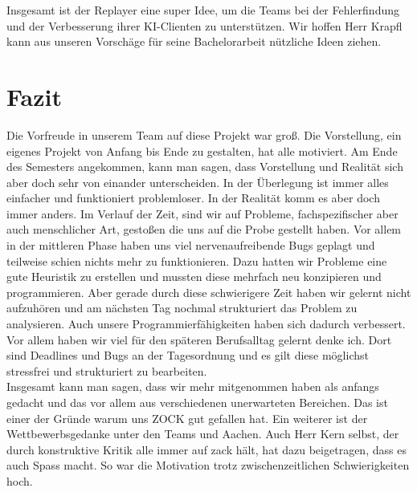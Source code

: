 \documentclass[12pt,a4paper,bibliography=totocnumbered,listof=totocnumbered]{scrartcl}
\begin{document}
	Insgesamt ist der Replayer eine super Idee, um die Teams bei der Fehlerfindung und der Verbesserung ihrer KI-Clienten zu unterstützen. Wir hoffen Herr Krapfl kann aus unseren Vorschäge für seine Bachelorarbeit nützliche Ideen ziehen.
	
    \newpage
    \section{Fazit}
    \vspace{1em}
	Die Vorfreude in unserem Team auf diese Projekt war groß. Die Vorstellung, ein eigenes Projekt von Anfang bis Ende zu gestalten, hat alle motiviert. Am Ende des Semesters angekommen, kann man sagen, dass Vorstellung und Realität sich aber doch sehr von einander unterscheiden. In der Überlegung ist immer alles einfacher und funktioniert problemloser. In der Realität komm es aber doch immer anders. Im Verlauf der Zeit, sind wir auf Probleme, fachspezifischer aber auch menschlicher Art, gestoßen die uns auf die Probe gestellt haben. Vor allem in der mittleren Phase haben uns viel nervenaufreibende Bugs geplagt und teilweise schien nichts mehr zu funktionieren. Dazu hatten wir Probleme eine gute Heuristik zu erstellen und mussten diese mehrfach neu konzipieren und programmieren. Aber gerade durch diese schwierigere Zeit haben wir gelernt nicht aufzuhören und am nächsten Tag nochmal strukturiert das Problem zu analysieren. Auch unsere Programmierfähigkeiten haben sich dadurch verbessert. Vor allem haben wir viel für den späteren Berufsalltag gelernt denke ich. Dort sind Deadlines und Bugs an der Tagesordnung und es gilt diese möglichst stressfrei und strukturiert zu bearbeiten.\\
	Insgesamt kann man sagen, dass wir mehr mitgenommen haben als anfangs gedacht und das vor allem aus verschiedenen unerwarteten Bereichen. Das ist einer der Gründe warum uns \grqq ZOCK\glqq{} gut gefallen hat. Ein weiterer ist der Wettbewerbsgedanke unter den Teams und Aachen. Auch Herr Kern selbst, der durch konstruktive Kritik alle immer \glqq auf zack\grqq{} hält, hat dazu beigetragen, dass es auch Spass macht. So war die Motivation trotz zwischenzeitlichen Schwierigkeiten hoch.\\
\end{document}
